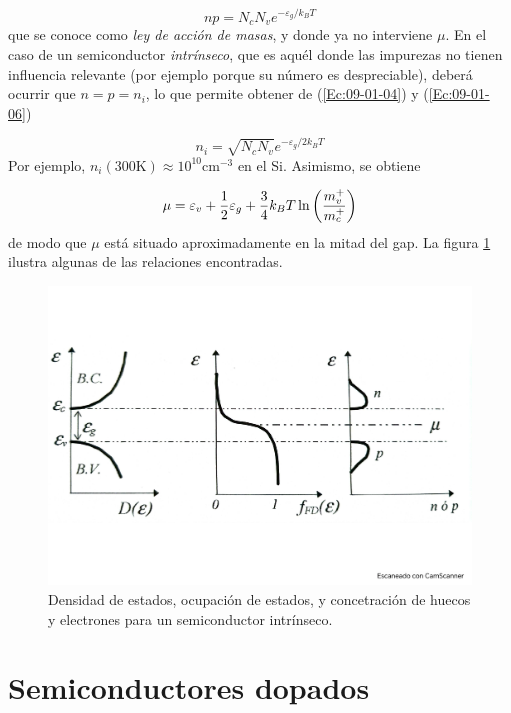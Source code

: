\begin{equation} 
	n p = N_c N_v e^{-\varepsilon_g/k_BT}\label{Ec:09-01-06}
\end{equation}
que se conoce como \textit{ley de acción de masas}, y donde ya no interviene $\mu$. En el caso de un semiconductor \textit{intrínseco}, que es aquél donde las impurezas no tienen influencia relevante (por ejemplo porque su número es despreciable), deberá ocurrir que $n=p=n_i$, lo que permite obtener de (\ref{Ec:09-01-04}) y (\ref{Ec:09-01-06})

\begin{equation}
	n_i = \sqrt{N_cN_v}e^{-\varepsilon_g/2k_BT} \label{Ec:09-01-07}
\end{equation}
Por ejemplo, $n_i(300\unit{\K})\approx\unit{10^{10}\cm^{-3}}$ en el Si. Asimismo, se obtiene

\begin{equation}
	\mu = \varepsilon_v + \frac{1}{2} \varepsilon_g + \frac{3}{4} k_B T \ln \left( \frac{m_v^+}{m_c^+} \right) \label{Ec:09-01-08}
\end{equation}
de modo que $\mu$ está situado aproximadamente en la mitad del gap. La figura \ref{Fig:09-02} ilustra algunas de las relaciones encontradas.
\begin{figure}[h!] \centering
	\includegraphics[scale=0.4]{Cuerpo/Ch_09/Fotos libro 2.pdf}
	\caption{Densidad de estados, ocupación de estados, y concetración de huecos y electrones para un semiconductor intrínseco.}
	\label{Fig:09-02}
\end{figure}

\section{Semiconductores dopados}

